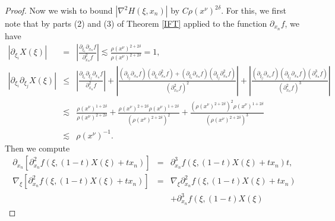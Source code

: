 \documentclass{amsart}
\theoremstyle{plain}
\numberwithin{equation}{section}
\begin{document}
\begin{proof}
Now we wish to bound $\left\vert \nabla ^{2}H\left( \xi ,x_{n}\right)
\right\vert $ by $C\rho \left( x^{\nu }\right) ^{2\delta }$. For this, we
first note that by parts (2) and (3) of Theorem \ref{IFT} applied to the
function $\partial _{x_{n}}f$, we have%
\begin{eqnarray*}
\left\vert \partial _{\xi _{i}}X\left( \xi \right) \right\vert &=&\left\vert 
\frac{\partial _{\xi _{i}}\partial _{x_{n}}f}{\partial _{x_{n}}^{2}f}%
\right\vert \lesssim \frac{\rho \left( x^{\nu }\right) ^{2+2\delta }}{\rho
\left( x^{\nu }\right) ^{2+2\delta }}=1, \\
\left\vert \partial _{\xi _{i}}\partial _{\xi _{j}}X\left( \xi \right)
\right\vert &\leq &\left\vert \frac{\partial _{\xi _{i}}\partial _{\xi
_{j}}\partial _{x_{n}}f}{\partial _{x_{n}}^{2}f}\right\vert +\left\vert 
\frac{\left( \partial _{\xi _{j}}\partial _{x_{n}}f\right) \left( \partial
_{\xi _{i}}\partial _{x_{n}}^{2}f\right) +\left( \partial _{\xi
_{i}}\partial _{x_{n}}f\right) \left( \partial _{\xi _{j}}\partial
_{x_{n}}^{2}f\right) }{\left( \partial _{x_{n}}^{2}f\right) ^{2}}\right\vert
+\left\vert \frac{\left( \partial _{\xi _{j}}\partial _{x_{n}}f\right)
\left( \partial _{\xi _{j}}\partial _{x_{n}}f\right) \left( \partial
_{x_{n}}^{3}f\right) }{\left( \partial _{x_{n}}^{2}f\right) ^{3}}\right\vert
\\
&\lesssim &\frac{\rho \left( x^{\nu }\right) ^{1+2\delta }}{\rho \left(
x^{\nu }\right) ^{2+2\delta }}+\frac{\rho \left( x^{\nu }\right) ^{2+2\delta
}\rho \left( x^{\nu }\right) ^{1+2\delta }}{\left( \rho \left( x^{\nu
}\right) ^{2+2\delta }\right) ^{2}}+\frac{\left( \rho \left( x^{\nu }\right)
^{2+2\delta }\right) ^{2}\rho \left( x^{\nu }\right) ^{1+2\delta }}{\left(
\rho \left( x^{\nu }\right) ^{2+2\delta }\right) ^{3}} \\
&\lesssim &\rho \left( x^{\nu }\right) ^{-1}.
\end{eqnarray*}%
Then we compute%
\begin{eqnarray*}
\partial _{x_{n}}\left[ \partial _{x_{n}}^{2}f\left( \xi ,\left( 1-t\right)
X\left( \xi \right) +tx_{n}\right) \right] &=&\partial _{x_{n}}^{3}f\left(
\xi ,\left( 1-t\right) X\left( \xi \right) +tx_{n}\right) t, \\
\nabla _{\xi }\left[ \partial _{x_{n}}^{2}f\left( \xi ,\left( 1-t\right)
X\left( \xi \right) +tx_{n}\right) \right] &=&\nabla _{\xi }\partial
_{x_{n}}^{2}f\left( \xi ,\left( 1-t\right) X\left( \xi \right) +tx_{n}\right)
\\
&&+\partial _{x_{n}}^{3}f\left( \xi ,\left( 1-t\right) X\left( \xi \right)

\end{eqnarray*}
\end{proof}
\end{document}
